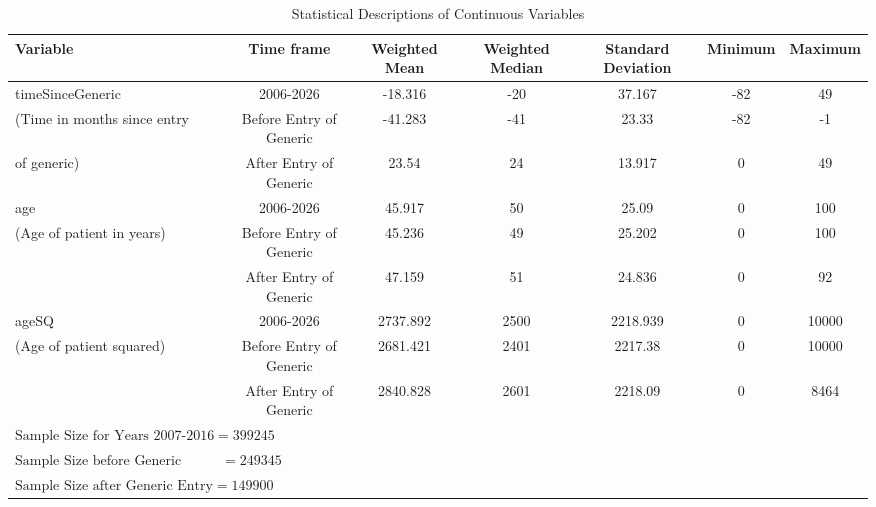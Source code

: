\begin{table}[htbp]\centering
\def\sym#1{\ifmmode^{#1}\else\(^{#1}\)\fi}
\caption{Statistical Descriptions of Continuous Variables\label{tab1}}
\begin{tabular}{l*{6}{c}}
\hline\hline
            Variable&\multicolumn{1}{c}{Time frame}&\multicolumn{1}{c}{Weighted Mean}&\multicolumn{1}{c}{Weighted Median}&\multicolumn{1}{c}{Standard Deviation}&\multicolumn{1}{c}{Minimum}&\multicolumn{1}{c}{Maximum}\\
\hline
timeSinceGeneric                    &     2006-2026&             -18.316&    -20&   37.167&     -82&  49\\
(Time in months since entry &     Before Entry of Generic&     -41.283&    -41&    23.33 &     -82&  -1\\
 of generic)   &     After Entry of Generic&       23.54 &    24&      13.917&     0&  49\\
[1em]
age                                 &     2006-2026&             45.917&    50&    25.09 &     0&  100\\
(Age of patient in years)           &     Before Entry of Generic&     45.236&    49&    25.202&     0&  100\\
                                    &     After Entry of Generic&      47.159&    51&    24.836&     0&  92\\
[1em]
ageSQ                               &     2006-2026&             2737.892&    2500&  2218.939&     0&  10000\\
(Age of patient squared)   &     Before Entry of Generic&    2681.421&    2401&  2217.38 &     0&  10000\\
                                    &     After Entry of Generic&      2840.828&    2601&  2218.09 &     0&  8464\\
\hline
$\text{Sample Size for Years 2007-2016} = 399245$\\
$\text{Sample Size before Generic Entry} = 249345$\\
$\text{Sample Size after Generic Entry} = 149900$\\
\hline\hline

\end{tabular}
\label{tab:Table4.2}
\end{table}
